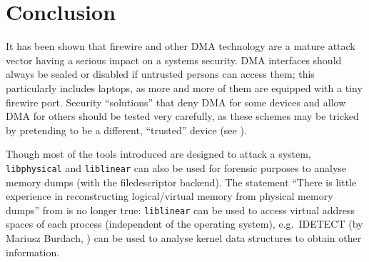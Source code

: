 %
%

\section{Conclusion}

It has been shown that firewire and other DMA technology are a mature attack
vector having a serious impact on a systems security. DMA interfaces should
always be sealed or disabled if untrusted persons can access them; this
particularly includes laptops, as more and more of them are equipped with a tiny
firewire port.  Security ``solutions'' that deny DMA for some devices and allow
DMA for others should be tested very carefully, as these schemes may be tricked
by pretending to be a different, ``trusted'' device (see
\cite{rux2k6firewire:2006}).

Though most of the tools introduced are designed to attack a system,
\texttt{libphysical} and \texttt{liblinear} can also be used for forensic
purposes to analyse memory dumps (with the filedescriptor backend). The
statement ``There is little experience in reconstructing logical/virtual memory
from physical memory dumps'' from \cite{cansecwest_firewire:2005} is no longer
true: \texttt{liblinear} can be used to access virtual address spaces of each
process (independent of the operating system), e.g.~IDETECT (by Mariusz Burdach,
\cite{finding_digital_evidence_in_physical_memory:2006}) can be used to analyse
kernel data structures to obtain other information.


